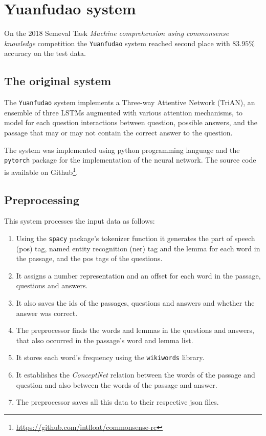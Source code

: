 \section{Yuanfudao system}
\label{sec:yuanfudao}
On the 2018 Semeval Task \textit{Machine comprehension using commonsense knowledge} competition the \texttt{Yuanfudao} \cite{Wang:2018} system reached second place with $83.95\%$ accuracy on the test data.

\subsection{The original system}

The \texttt{Yuanfudao} system implements a Three-way Attentive Network (TriAN), an ensemble of three LSTMs augmented with various attention mechanisms, to model for each question interactions between question, possible answers, and the passage that may or may not contain the correct answer to the question.

The system was implemented using python programming language and the \texttt{pytorch} package for the implementation of the neural network. The source code is available on Github\footnote{\url{https://github.com/intfloat/commonsense-rc}}.


\subsection{Preprocessing}
This system processes the input data as follows:

\begin{enumerate}
	\item Using the \texttt{spacy} package's tokenizer function it generates the part of speech (pos) tag, named entity recognition (ner) tag and the lemma for each word in the passage, and the pos tags of the questions.
	\item It assigns a number representation and an offset for each word in the passage, questions and answers.
	\item It also saves the ids of the passages, questions and answers and whether the answer was correct.
	\item The preprocessor finds the words and lemmas in the questions and answers, that also occurred in the passage's word and lemma list. 
	\item It stores each word's frequency using the \texttt{wikiwords} library.
	\item It  establishes the \textit{ConceptNet} relation between the words of the passage and question and also between the words of the passage and answer.
	\item The preprocessor saves all this data to their respective json files.
\end{enumerate}


